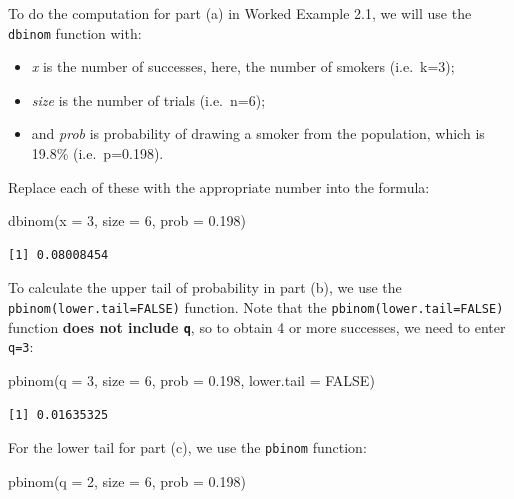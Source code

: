 \documentclass[
  a4paper,
]{memoir}
\newenvironment{Shaded}{\begin{snugshade}}{\end{snugshade}}
\newcommand{\AttributeTok}[1]{\textcolor[rgb]{0.00,0.00,0.00}{#1}}
\newcommand{\ConstantTok}[1]{\textcolor[rgb]{0.00,0.00,0.00}{#1}}
\newcommand{\DecValTok}[1]{\textcolor[rgb]{0.00,0.00,0.00}{#1}}
\newcommand{\FloatTok}[1]{\textcolor[rgb]{0.00,0.00,0.00}{#1}}
\newcommand{\FunctionTok}[1]{\textcolor[rgb]{0.00,0.00,0.00}{#1}}
\newcommand{\NormalTok}[1]{\textcolor[rgb]{0.00,0.00,0.00}{#1}}
\providecommand{\tightlist}{%
  \setlength{\itemsep}{0pt}\setlength{\parskip}{0pt}}
\begin{document}
To do the computation for part (a) in Worked Example 2.1, we will use
the \texttt{dbinom} function with:

\begin{itemize}
\tightlist
\item
  \emph{x} is the number of successes, here, the number of smokers
  (i.e.~k=3);
\item
  \emph{size} is the number of trials (i.e.~n=6);
\item
  and \emph{prob} is probability of drawing a smoker from the
  population, which is 19.8\% (i.e.~p=0.198).
\end{itemize}

Replace each of these with the appropriate number into the formula:

\begin{Shaded}
\begin{Highlighting}[]
\FunctionTok{dbinom}\NormalTok{(}\AttributeTok{x =} \DecValTok{3}\NormalTok{, }\AttributeTok{size =} \DecValTok{6}\NormalTok{, }\AttributeTok{prob =} \FloatTok{0.198}\NormalTok{)}
\end{Highlighting}
\end{Shaded}

\begin{verbatim}
[1] 0.08008454
\end{verbatim}

To calculate the upper tail of probability in part (b), we use the
\texttt{pbinom(lower.tail=FALSE)} function. Note that the
\texttt{pbinom(lower.tail=FALSE)} function \textbf{does not include
\texttt{q}}, so to obtain 4 or more successes, we need to enter
\texttt{q=3}:

\begin{Shaded}
\begin{Highlighting}[]
\FunctionTok{pbinom}\NormalTok{(}\AttributeTok{q =} \DecValTok{3}\NormalTok{, }\AttributeTok{size =} \DecValTok{6}\NormalTok{, }\AttributeTok{prob =} \FloatTok{0.198}\NormalTok{, }\AttributeTok{lower.tail =} \ConstantTok{FALSE}\NormalTok{)}
\end{Highlighting}
\end{Shaded}

\begin{verbatim}
[1] 0.01635325
\end{verbatim}

For the lower tail for part (c), we use the \texttt{pbinom} function:

\begin{Shaded}
\begin{Highlighting}[]
\FunctionTok{pbinom}\NormalTok{(}\AttributeTok{q =} \DecValTok{2}\NormalTok{, }\AttributeTok{size =} \DecValTok{6}\NormalTok{, }\AttributeTok{prob =} \FloatTok{0.198}\NormalTok{)}
\end{Highlighting}
\end{Shaded}
\end{document}
